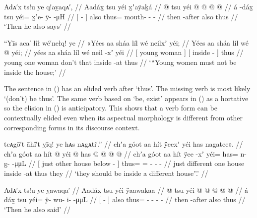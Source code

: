 \ex\label{ex:100-168-also-says}%
%
\begingl
	\glpreamble	Adᴀ′x ts!u ye q!aỵaqᴀ′, //
	\glpreamble	Aadáx̱ tsu yéi x̱ʼaÿaḵá //
	\gla	{}  @ {} {}
		tsu
		yéi @  @ {} @ {} @ {} //
	\glb	{} á -dáx̱ {}
		tsu
		yéi= x̱ʼe- ÿ-  -μH //
	\glc	{}[  - {}]
		also 
		thus= mouth- -  - //
	\gld	{} then -after {}
		also 
		thus  {} {} {} //
	\glft	‘Then he also says’
		//
\endgl
\xe

\ex\label{ex:100-169-young-women}%
%
\begingl
	\glpreamble	“Yīs aca′ łîł wé′nełq! ye //
	\glpreamble	«\!Yées aa sháa líl wé neilxʼ yéi; //
	\gla	{} Yées aa sháa {} 
		líl
		{} wé  @ {} {}
		yéi; //
	\glb	{} yées aa sháa {} 
		líl
		{} wé neil -xʼ {}
		yéi //
	\glc	{}[ young  woman {}]
		{}[  inside - {}]
		thus //
	\gld	{} young one woman {} 
		don’t
		{} that inside -at {}
		thus //
	\glft	‘“Young women must not be inside the house;’
		//
\endgl
\xe

The sentence in (\lastx) has an elided verb after  ‘thus’.
The missing verb is most likely  ‘(don’t) be thus’.
The same verb based on  ‘be, exist’ appears in (\nextx) as a hortative so the elision in (\lastx) is anticipatory.
This shows that a verb form can be contextually elided even when its aspectual morphology is different from other corresponding forms in its discourse context.

\ex\label{ex:100-170-different-house}%
%
\begingl
	\glpreamble	tcᴀg̣ō′t āhî′t ỵīq! ye hᴀs nᴀgᴀti′.” //
	\glpreamble	chʼa g̱óot aa hít ÿeexʼ yéi has nag̱atee\!». //
	\gla	{} chʼa g̱óot aa hít  @ {} {} 
		yéi @ has @  @ {} @ {} @ {}//
	\glb	{} chʼa g̱óot aa hít ÿee -xʼ {} 
		yéi= has= n- g̱-  -μμL //
	\glc	{}[ just other  house below - {}]
		thus= = - -  - //
	\gld	{} just different one house inside -at {}
		thus they  {} {} {} {} {} {} //
	\glft	‘they should be inside a different house”.’
		//
\endgl
\xe

\ex\label{ex:100-171-also-said}%
%
\begingl
	\glpreamble	Adᴀ′x ts!u ye ỵawaqa′ //
	\glpreamble	Aadáx̱ tsu yéi ÿaawaḵaa //
	\gla	{}  @ {} {}
		tsu
		yéi @  @ {} @ {} @ {} @ {} //
	\glb	{} á -dáx̱ {} 
		tsu
		yéi= ÿ- wu- i-  -μμL //
	\glc	{}[  - {}]
		also
		thus= - - -  - //
	\gld	{} then -after {}
		also
		thus  {} {} {} {} //
	\glft	‘Then he also said’
		//
\endgl
\xe

